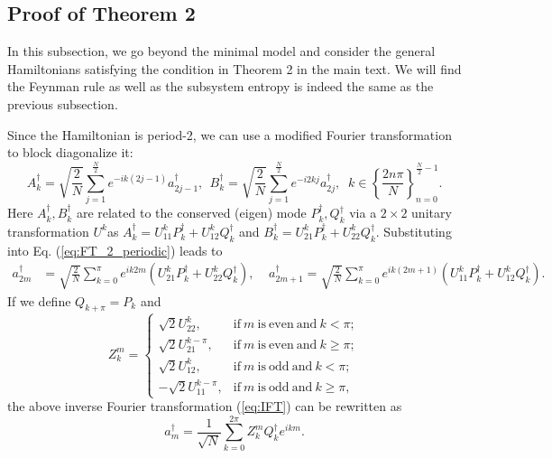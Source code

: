 \subsection{Proof of %
Theorem 2 \label{subsec:Proof-of-main}}

In this subsection, we go %
beyond the minimal model and consider the general Hamiltonians satisfying the condition in %
Theorem 2 in the main text. We will find the Feynman rule as well as the subsystem entropy
is indeed the same as the previous subsection.

Since the Hamiltonian is period-2, we can use a modified Fourier
transformation to block diagonalize it:
\begin{equation}
A_{k}^{\dagger}=\sqrt{\frac{2}{N}}\sum_{j=1}^{\frac{N}{2}}e^{-ik(2j-1)}a_{2j-1}^{\dagger},\ \ B_k^\dag=\sqrt{\frac{2}{N}}\sum_{j=1}^{\frac{N}{2}}e^{-i2kj}a_{2j}^{\dagger},\;\;%
k\in\left\{\frac{2n\pi}{N}\right\}^{\frac{N}{2}-1}_{n=0}.
\label{eq:FT_2_periodic}
\end{equation}
Here $A_{k}^{\dagger},B_{k}^{\dagger}$ are related to the conserved (eigen) mode
$P_{k}^{\dagger},Q_{k}^{\dagger}$ via a $2\times2$ unitary transformation
$U^{k}$as $A_{k}^{\dagger}=U_{11}^{k}P_{k}^{\dagger}+U_{12}^{k}Q_{k}^{\dagger}$
and $B_{k}^{\dagger}=U_{21}^{k}P_{k}^{\dagger}+U_{22}^{k}Q_{k}^{\dagger}$.
Substituting into Eq. (\ref{eq:FT_2_periodic}) leads to 
\begin{align}
a_{2m}^{\dagger} & =\sqrt{\frac{2}{N}}\sum_{k=0}^{\pi}e^{ik2m}(U_{21}^{k}P_{k}^{\dagger}+U_{22}^{k}Q_{k}^{\dagger}),\;\;\;\;
a_{2m+1}^{\dagger}  =\sqrt{\frac{2}{N}}\sum_{k=0}^{\pi}e^{ik(2m+1)}(U_{11}^{k}P_{k}^{\dagger}+U_{12}^{k}Q_{k}^{\dagger}).
\label{eq:IFT}
\end{align}
If we define $Q_{k+\pi}=P_{k}$ %
and 
\begin{equation}
Z_{k}^{m}=\begin{cases}
\sqrt{2}U_{22}^{k}, & \mathrm{if\ }m\ \mathrm{is\ even\ and}\ k<\pi;\\
\sqrt{2}U_{21}^{k-\pi}, & \mathrm{if\ }m\ \mathrm{is\ even\ and}\ k\geq\pi;\\
\sqrt{2}U_{12}^{k}, & \mathrm{if\ }m\ \mathrm{is\ odd\ and}\ k<\pi;\\
-\sqrt{2}U_{11}^{k-\pi}, & \mathrm{if\ }m\ \mathrm{is\ odd\ and}\ k\geq\pi,
\end{cases}
\label{eq:Zkm}
\end{equation}
the above inverse Fourier transformation (\ref{eq:IFT}) can be rewritten as
\[
a_{m}^{\dagger}=\frac{1}{\sqrt{N}}\sum_{k=0}^{2\pi}Z_{k}^{m}Q_{k}^{\dagger}e^{ikm}.
\]
